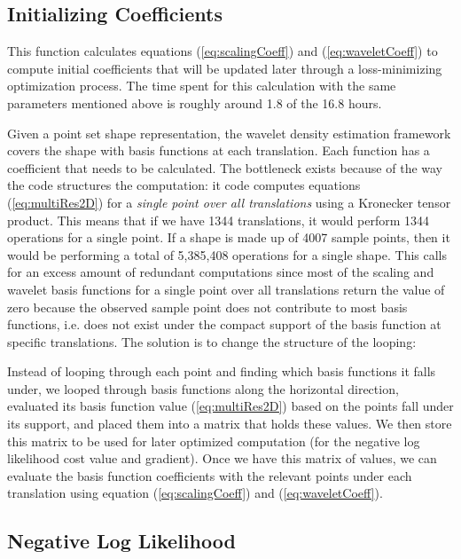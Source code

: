 \documentclass[../tech_report_1.tex]{subfiles}
\begin{document}
\subsection*{Initializing Coefficients}

This function calculates equations (\ref{eq:scalingCoeff})
and (\ref{eq:waveletCoeff}) to compute initial coefficients
that will be updated later through a loss-minimizing optimization process.
The time spent for this calculation with the same parameters mentioned
above is roughly around 1.8 of the 16.8 hours. 

Given a point set shape representation, the wavelet density estimation framework covers the
shape with basis functions at each translation. Each function has
a coefficient that needs to be calculated. The bottleneck exists because of the way the code structures the computation: it
code computes equations (\ref{eq:multiRes2D}) for a \emph{single
point over all translations} using a Kronecker
tensor product.  \cite{van2000ubiquitous}
 This means that if we have 1344 translations,
it would perform 1344 operations for a single point. If a shape is made up of 4007 sample
points, then it would be performing a total of 5,385,408 operations
for a single shape. This calls for an excess amount of redundant computations
since most of the scaling and wavelet basis functions for a single
point over all translations return the value of zero because the observed sample point does not contribute
to most basis functions, i.e. does not exist under the compact support
of the basis function at specific translations. The solution is to change the structure of the looping: 

Instead of looping through each point and finding which basis functions
it falls under, we looped through basis functions along the horizontal
direction, evaluated its basis function value (\ref{eq:multiRes2D})
based on the points fall under its support, and placed them into a
matrix that holds these values. We then store this matrix to be used
for later optimized computation (for the negative log likelihood cost
value and gradient). Once we have this matrix of values, we can evaluate the basis function coefficients with the relevant points
under each translation using equation (\ref{eq:scalingCoeff}) and
(\ref{eq:waveletCoeff}). 


\subsection*{Negative Log Likelihood}
\end{document}

